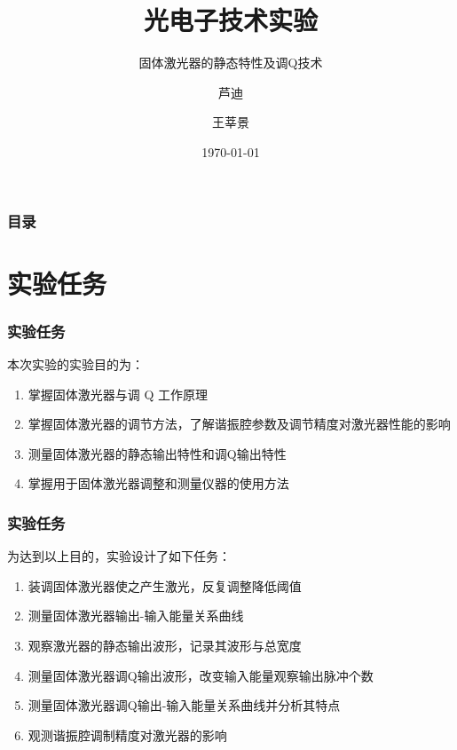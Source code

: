 \documentclass{beamer}
\title[光电中期报告] %
{光电子技术实验}
\subtitle{固体激光器的静态特性及调Q技术}
\author[芦, 王] %
{芦迪 \and 王莘景}
\institute[THU, EE] %
{

  Department of Electronic Engineering,\\
  Tsinghua University
}
\date[2017.11.8] %
{\today}
\begin{document}
\frame{\titlepage}


\begin{frame}
\frametitle{目录}
\tableofcontents
\end{frame}


\section{实验任务}

\begin{frame}
\frametitle{实验任务}

本次实验的实验目的为：
\begin{enumerate}
  \item 掌握固体激光器与调 Q 工作原理
  \item 掌握固体激光器的调节方法，了解谐振腔参数及调节精度对激光器性能的影响
  \item 测量固体激光器的静态输出特性和调Q输出特性
  \item 掌握用于固体激光器调整和测量仪器的使用方法
\end{enumerate}
\end{frame}

\begin{frame}
  \frametitle{实验任务}
为达到以上目的，实验设计了如下任务： \\

\begin{enumerate}
    \item 装调固体激光器使之产生激光，反复调整降低阈值
    \item 测量固体激光器输出-输入能量关系曲线
    \item 观察激光器的静态输出波形，记录其波形与总宽度
    \item 测量固体激光器调Q输出波形，改变输入能量观察输出脉冲个数
    \item 测量固体激光器调Q输出-输入能量关系曲线并分析其特点
    \item 观测谐振腔调制精度对激光器的影响
\end{enumerate}
\end{frame}



\end{document}
